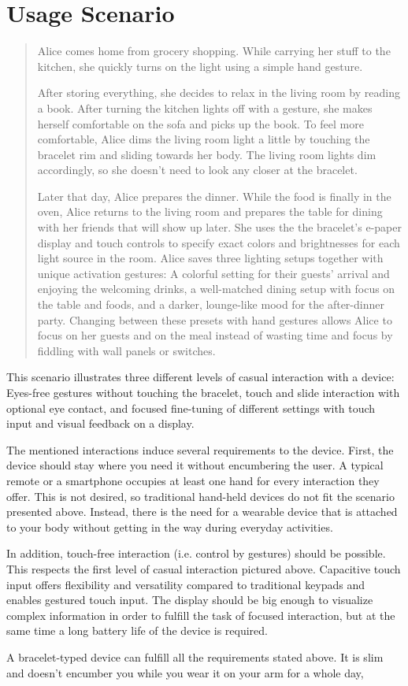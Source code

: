 \chapter{Usage Scenario}

\begin{quotation}
Alice comes home from grocery shopping. While carrying her stuff to the kitchen, she quickly turns on the light using a simple hand gesture.

After storing everything, she decides to relax in the living room by reading a book. After turning the kitchen lights off with a gesture, she makes herself comfortable on the sofa and picks up the book. To feel more comfortable, Alice dims the living room light a little by touching the bracelet rim and sliding towards her body. The living room lights dim accordingly, so she doesn't need to look any closer at the bracelet.

Later that day, Alice prepares the dinner. While the food is finally in the oven, Alice returns to the living room and prepares the table for dining with her friends that will show up later. She uses the the bracelet's e-paper display and touch controls to specify exact colors and brightnesses for each light source in the room. Alice saves three lighting setups together with unique activation gestures: A colorful setting for their guests' arrival and enjoying the welcoming drinks, a well-matched dining setup with focus on the table and foods, and a darker, lounge-like mood for the after-dinner party. Changing between these presets with hand gestures allows Alice to focus on her guests and on the meal instead of wasting time and focus by fiddling with wall panels or switches.
\end{quotation}

This scenario illustrates three different levels of casual interaction with a device: Eyes-free gestures without touching the bracelet, touch and slide interaction with optional eye contact, and focused fine-tuning of different settings with touch input and visual feedback on a display.

The mentioned interactions induce several requirements to the device. First, the device should stay where you need it without encumbering the user. A typical remote or a smartphone occupies at least one hand for every interaction they offer. This is not desired, so traditional hand-held devices do not fit the scenario presented above. Instead, there is the need for a wearable device that is attached to your body without getting in the way during everyday activities.

In addition, touch-free interaction (i.e. control by gestures) should be possible. This respects the first level of casual interaction pictured above. Capacitive touch input offers flexibility and versatility compared to traditional keypads and enables gestured touch input. The display should be big enough to visualize complex information in order to fulfill the task of focused interaction, but at the same time a long battery life of the device is required.

A bracelet-typed device can fulfill all the requirements stated above. It is slim and doesn't encumber you while you wear it on your arm for a whole day, 